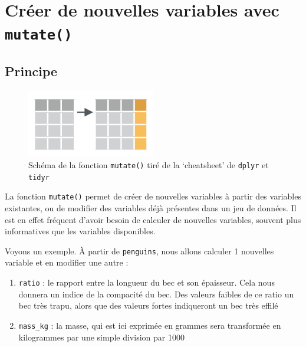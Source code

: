 \documentclass[
  a4paper,
  DIV=11,
  numbers=noendperiod,
  oneside]{scrreprt}
\providecommand{\tightlist}{%
  \setlength{\itemsep}{0pt}\setlength{\parskip}{0pt}}\usepackage{longtable,booktabs,array}
\begin{document}
\section{\texorpdfstring{Créer de nouvelles variables avec
\texttt{mutate()}}{Créer de nouvelles variables avec mutate()}}\label{mutate}

\subsection{Principe}\label{principe-1}

\begin{figure}[H]

{\centering \includegraphics[width=0.5\textwidth,height=\textheight]{images/mutate.png}

}

\caption{Schéma de la fonction \texttt{mutate()} tiré de la `cheatsheet'
de \texttt{dplyr} et \texttt{tidyr}}

\end{figure}%

La fonction \texttt{mutate()} permet de créer de nouvelles variables à
partir des variables existantes, ou de modifier des variables déjà
présentes dans un jeu de données. Il est en effet fréquent d'avoir
besoin de calculer de nouvelles variables, souvent plus informatives que
les variables disponibles.

Voyons un exemple. À partir de \texttt{penguins}, nous allons calculer 1
nouvelles variable et en modifier une autre :

\begin{enumerate}
\def\labelenumi{\arabic{enumi}.}
\tightlist
\item
  \texttt{ratio} : le rapport entre la longueur du bec et son épaisseur.
  Cela nous donnera un indice de la compacité du bec. Des valeurs
  faibles de ce ratio un bec très trapu, alors que des valeurs fortes
  indiqueront un bec très effilé
\item
  \texttt{mass\_kg} : la masse, qui est ici exprimée en grammes sera
  transformée en kilogrammes par une simple division par 1000
\end{enumerate}
\end{document}
